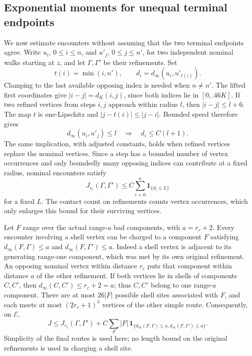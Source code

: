 \subsection{Exponential moments for unequal terminal endpoints}

We now estimate encounters without assuming that the two terminal
endpoints agree.  Write \(u_i\), \(0\le i\le n\), and
\(u'_j\), \(0\le j\le n'\), for two independent nominal walks
starting at \(z\), and let \(\Gamma,\Gamma'\) be their refinements.
Set
\begin{equation}\label{rt:clamp}
 t(i)=\min(i,n'),\qquad d_i=d_\infty(u_i,u'_{t(i)}).
\end{equation}
Clamping to the last available opposing index is needed when
\(n\ne n'\).  The lifted first coordinates give
\(|i-j|=d_K(i,j)\), since both indices lie in \([0,.46K]\).
If two refined vertices from steps \(i,j\) approach within radius
\(l\), then \(|i-j|\le l+6\).  The map \(t\) is
one-Lipschitz and \(|j-t(i)|\le|j-i|\).  Bounded speed therefore
gives
\begin{equation}\label{rt:alignment}
 d_\infty(u_i,u'_j)\le l
 \quad\Longrightarrow\quad d_i\le C(l+1).
\end{equation}
The same implication, with adjusted constants, holds when refined
vertices replace the nominal vertices.  Since a step has a bounded
number of vertex occurrences and only boundedly many opposing indices
can contribute at a fixed radius, nominal encounters satisfy
\begin{equation}\label{rt:nominal-charge}
 J_{r_c}(\Gamma,\Gamma')
 \le C\sum_{i=0}^n\mathbf1_{\{d_i\le L\}}
\end{equation}
for a fixed \(L\).  The contact count on refinements counts vertex
occurrences, which only enlarges this bound for their surviving
vertices.

Let \(F\) range over the actual range-\(a\) bad components, with
\(a=r_c+2\).  Every encounter involving a shell vertex can be charged
to a component \(F\) satisfying
\(d_\infty(F,\Gamma)\le a\) and
\(d_\infty(F,\Gamma')\le a\).  Indeed a shell vertex is adjacent
to its generating range-one component, which was met by its own
original refinement.  An opposing nominal vertex within distance
\(r_c\) puts that component within distance \(a\) of the other
refinement.  If both vertices lie in shells of components \(C,C'\),
then \(d_\infty(C,C')\le r_c+2=a\); thus \(C,C'\) belong to
one range-\(a\) component.  There are at most \(26|F|\) possible
shell sites associated with \(F\), and each meets at most
\((2r_c+1)^3\) vertices of the other simple route.  Consequently,
on \(\mathcal E\),
\begin{equation}\label{rt:detour-charge}
 J\le J_{r_c}(\Gamma,\Gamma')
       +C\sum_F |F|\,
       \mathbf1_{\{d_\infty(F,\Gamma)\le a,
                      d_\infty(F,\Gamma')\le a\}}.
\end{equation}
Simplicity of the final routes is used here; no length bound on the
original refinements is used in charging a shell site.


